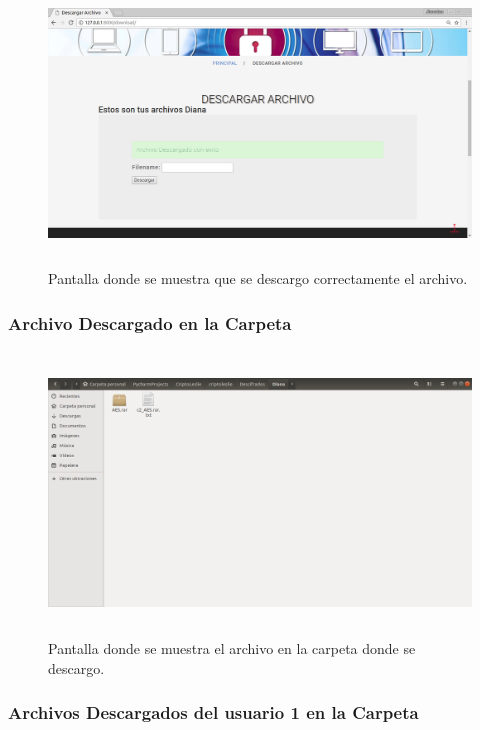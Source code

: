 			\begin{figure}[H]
			\centering
			\includegraphics[width=14cm, height=7.5cm]{./images/Implementacion/DescargarArchivoOk.png}
			\caption{Pantalla donde se muestra que se descargo correctamente el archivo.}
			\label{fig:6-1-33} 
			\end{figure}

\subsubsection{Archivo Descargado en la Carpeta}

			\begin{figure}[H]
			\centering
			\includegraphics[width=14cm, height=7.5cm]{./images/Implementacion/DescargarArchivoCarpeta.png}
			\caption{Pantalla donde se muestra el archivo en la carpeta donde se descargo.}
			\label{fig:6-1-34} 
			\end{figure}

\subsubsection{Archivos Descargados del usuario 1 en la Carpeta}

